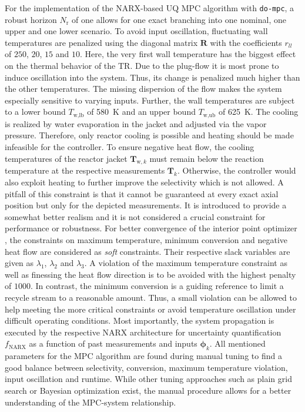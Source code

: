 \noindent
\newline
For the implementation of the NARX-based UQ MPC algorithm
with \texttt{do-mpc}, a robust horizon $N_\text{r}$ of one allows for one exact branching into 
one nominal, one upper and one lower scenario. 
To avoid input oscillation,
fluctuating wall temperatures are penalized using the diagonal matrix $\bm{R}$ with the coefficients $r_{ll}$ of 
$250$, $20$, $15$ and $10$. Here, the very first wall temperature has the biggest effect on the thermal behavior
of the TR. Due to the plug-flow it is most prone to induce oscillation into the system. Thus, its change
is penalized much higher than the other temperatures. The missing dispersion of the flow makes the system
especially sensitive to varying inputs. Further, the wall temperatures are subject to a lower bound $T_\text{w,lb}$ of 
\SI{580}{\kelvin} and an upper bound $T_\text{w,ub}$ of \SI{625}{\kelvin}. 
The cooling is realized by water evaporation in the jacket and adjusted via the vapor pressure.
Therefore, only reactor cooling is possible and heating should be made infeasible for the controller.
To ensure negative heat flow, the
cooling temperatures of the reactor jacket $\bm{T}_{\text{w},k}$ must remain below the reaction temperature 
at the respective measurements $\bm{T}_k$. Otherwise, the controller would also exploit heating to 
further improve the selectivity which is not allowed.
A pitfall of this constraint is that it cannot be guaranteed at every exact axial position but only for the 
depicted measurements. It is introduced to provide a somewhat better realism and
it is not considered a crucial constraint for performance or robustness.
For better convergence of the interior point optimizer
\cite{Waechter2006}, the constraints on maximum temperature, minimum conversion and negative heat flow are
considered as \emph{soft} constraints. Their respective slack variables are given as $\lambda_1$, $\lambda_2$ and
$\lambda_3$. A violation of the maximum temperature constraint as well as finessing the heat flow direction
is to be avoided with the highest penalty of $1000$. In contrast, the minimum conversion is a guiding reference
to limit a recycle stream to a reasonable amount. Thus, a small violation can be allowed to help meeting
the more critical constraints or avoid temperature oscillation under difficult operating conditions.
Most importantly, the system propagation is executed by the respective NARX architecture for uncertainty
quantification $f_\text{NARX}$ as a function of past measurements and inputs $\bm{\phi}_k$. 
All mentioned parameters for the MPC algorithm are found during manual tuning to find a good balance
between selectivity, conversion, maximum temperature violation, input oscillation and runtime.
While other tuning approaches such as plain grid search or Bayesian optimization exist,
the manual procedure allows for a better understanding of the MPC-system relationship.


